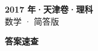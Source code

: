 \documentclass[zihao=-4, a4paper]{ctexart}
\begin{document}
\begin{center}
  {\Large\bfseries 2017 年·天津卷·理科}\\[4pt]
  {\large 数学 · 简答版}
\end{center}
\medskip
{}

\clearpage
{}
\begin{center}{\Large\bfseries 答案速查}\end{center}
\medskip

\end{document}
